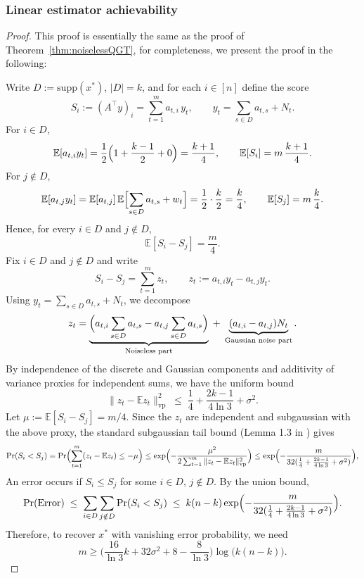 \documentclass{article}
\newcommand{\supp}{\mathrm{supp}}
\begin{document}
\subsubsection{Linear estimator achievability}
\begin{proof}
This proof is essentially the same as the proof of Theorem~\ref{thm:noiselessQGT}, for completeness, we present the proof in the following: 

Write $D := \supp(x^*)$, $|D|=k$, and for each $i\in[n]$ define the score
\[
S_i := (A^\top y)_i
= \sum_{t=1}^m a_{t,i}\,y_t,
\qquad
y_t = \sum_{s\in D} a_{t,s} + N_t.
\]
For $i\in D$,
\[
\mathbb{E}[a_{t,i}y_t]
= \frac12\Bigl(1 + \frac{k-1}{2} + 0\Bigr)
= \frac{k+1}{4},
\qquad
\mathbb{E}[S_i] = m\,\frac{k+1}{4}.
\]
For $j\notin D$,
\[
\mathbb{E}[a_{t,j}y_t]
= \mathbb{E}[a_{t,j}]\,\mathbb{E}\Bigl[\sum_{s\in D} a_{t,s} + w_t\Bigr]
= \frac12\cdot\frac{k}{2}
= \frac{k}{4},
\qquad
\mathbb{E}[S_j] = m\,\frac{k}{4}.
\]
Hence, for every $i\in D$ and $j\notin D$,
\[
\mathbb{E}[S_i - S_j] = \frac{m}{4}.
\]
Fix $i\in D$ and $j\notin D$ and write
\[
S_i - S_j = \sum_{t=1}^m z_t,
\qquad
z_t := a_{t,i}y_t - a_{t,j}y_t.
\]
Using $y_t = \sum_{s\in D} a_{t,s} + N_t$, we decompose
\[
z_t 
= \underbrace{\Bigl(a_{t,i}\sum_{s\in D} a_{t,s}
  - a_{t,j}\sum_{s\in D} a_{t,s}\Bigr)}_{\text{Noiseless part}}
  \;+\;
  \underbrace{(a_{t,i}-a_{t,j})N_t}_{\text{Gaussian noise part}}.
\]
By independence of the discrete and Gaussian components and additivity of variance proxies for independent sums, we have the uniform bound
\[
\|z_t - \mathbb{E}z_t\|^2_\text{vp}
\;\le\;
\frac14 + \frac{2k-1}{4\ln 3} + \sigma^2.
\]
Let $\mu := \mathbb{E}[S_i - S_j] = m/4$.  
Since the $z_t$ are independent and subgaussian with the above proxy, the standard subgaussian tail bound (Lemma 1.3 in \cite{rigollet_chapter_nodate}) gives
\[
\Pr(S_i < S_j)
= \Pr\Bigl(\sum_{t=1}^m (z_t - \mathbb{E}z_t) \le -\mu\Bigr)
\le 
\exp\Bigl(
  - \frac{\mu^2}{2 \sum_{t=1}^m \|z_t - \mathbb{E}z_t\|^2_\text{vp}}
\Bigr)
\le
\exp\Bigl(
  - \frac{m}{32(\frac14 + \frac{2k-1}{4\ln 3} + \sigma^2)}
\Bigr),
\]
An error occurs if $S_i \le S_j$ for some $i\in D$, $j\notin D$.  
By the union bound,
\[
\Pr(\text{Error})
\;\le\;
\sum_{i\in D}\sum_{j\notin D} \Pr(S_i < S_j)
\;\le\;
k(n-k)
\exp\Bigl(
  - \frac{m}{32(\frac14 + \frac{2k-1}{4\ln 3} + \sigma^2)}\Bigr).
\]
Therefore, to recover $x^*$ with vanishing error probability, we need 
\[
m\ge \bigl(\frac{16}{\ln3}k+32\sigma^2+8-\frac{8}{\ln3}\bigr)\log\bigl(k(n-k)\bigr).
\]
\end{proof}
\end{document}
